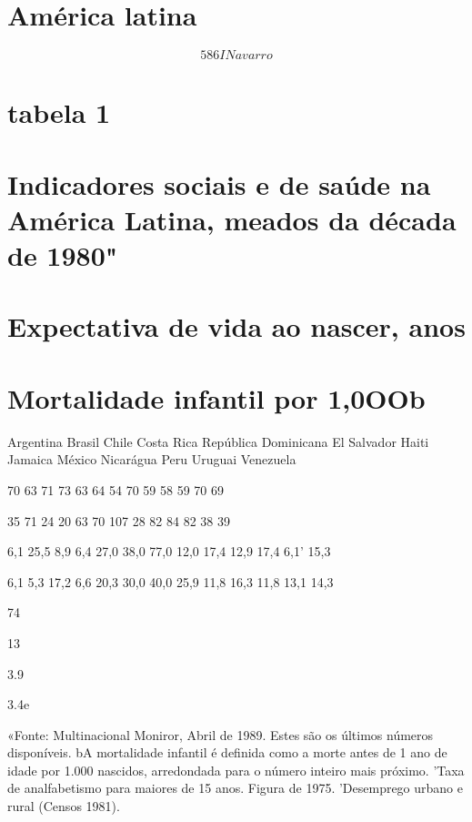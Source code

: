 \section{América latina}
 \par 
\[586 I Navarro\]
 \par 
\section{tabela 1}
 \par 
\section{Indicadores sociais e de saúde na América Latina, meados da década de 1980"}
 \par 
\section{Expectativa de vida ao nascer, anos}
 \par 
\section{Mortalidade infantil por 1,0OOb}
 \par 
Argentina Brasil Chile Costa Rica República Dominicana El Salvador Haiti Jamaica México Nicarágua Peru Uruguai Venezuela
 \par 
70 {\color{blue}63} 71 {\color{blue}73} 63 {\color{blue}64} 54 {\color{blue}70} 59 {\color{blue}58} 59 {\color{blue}70} {\color{blue}69}
 \par 
35 {\color{blue}71} 24 {\color{blue}20} 63 {\color{blue}70} {\color{blue}107} {\color{blue}28} 82 {\color{blue}84} 82 {\color{blue}38} {\color{blue}39}
 \par 
6,1 25,5 8,9 6,4 27,0 38,0 77,0 12,0 17,4 12,9 17,4 6,1' 15,3
 \par 
6,1 5,3 17,2 6,6 20,3 30,0 40,0 25,9 11,8 16,3 11,8 13,1 14,3
 \par 
74
 \par 
13
 \par 
3.{\color{blue}9}
 \par 
3.4e
 \par 
«Fonte: Multinacional Moniror, Abril de 1989. Estes são os últimos números disponíveis. bA mortalidade infantil é definida como a morte antes de {\color{blue}1} ano de idade por {\color{blue}1}.{\color{blue}000} nascidos, arredondada para o número inteiro mais próximo. 'Taxa de analfabetismo para maiores de {\color{blue}15} anos. Figura de 1975. 'Desemprego urbano e rural (Censos 1981).
 \par 
